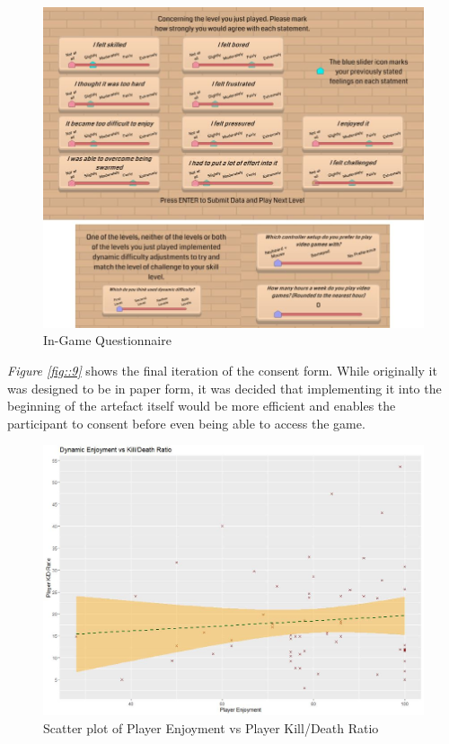 \documentclass[journal]{IEEEtran}
\begin{document}
\begin{figure}[h]
	\includegraphics[width=0.75\linewidth]{questionnaireingame.jpg}
	\caption{In-Game Questionnaire}
	\label{fig::10}
\end{figure} 



\textit{Figure \ref{fig::9}} shows the final iteration of the consent form. While originally it was designed to be in paper form, it was decided that implementing it into the beginning of the artefact itself would be more efficient and enables the participant to consent before even being able to access the game.

\newpage

\begin{figure}[h]
	\includegraphics[width=0.75\linewidth]{dynamicfunKDR.jpg}
	\caption{Scatter plot of Player Enjoyment vs Player Kill/Death Ratio}
	\label{fig::11}
\end{figure} 
\end{document}
